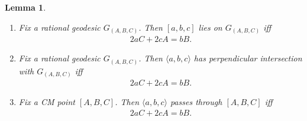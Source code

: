 \documentclass[11pt,letterpaper,reqno]{amsart}
\newtheorem{lemma}[theorem]{Lemma}
\numberwithin{equation}{section}
\numberwithin{figure}{section}
\numberwithin{table}{section}
\begin{document}
\begin{lemma} \label{lem:CM-RM-along-G-diophantine} ~
\begin{enumerate}
\item 
Fix a rational geodesic $G_{(A,B,C)}$. Then $[a,b,c]$ lies on $G_{(A,B,C)}$ iff  
\begin{align} \label{eqn:cond--CM-on-geo}
2aC+2cA=bB.
\end{align}
\item Fix a rational geodesic $G_{(A,B,C)}$. Then $\langle a,b,c \rangle$ has  perpendicular intersection with $G_{(A,B,C)}$ iff
\begin{align} \label{eq:cond--RM-on-geo}
2aC+2cA=bB.
\end{align}
\item 
Fix a CM point $[A,B,C]$. Then $\langle a,b,c \rangle$ passes through $[A,B,C]$ iff 
\begin{align} \label{eqn:cond--RM-on-CM}
2aC+2cA=bB.
\end{align}
\end{enumerate}
\end{lemma}
\end{document}
